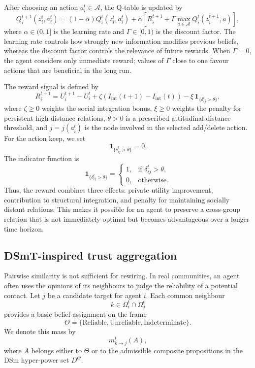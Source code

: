 \documentclass[11pt,a4paper]{article}
\begin{document}
After choosing an action $a_i^t\in\mathcal A$, the Q-table is updated by
\[
Q_i^{t+1}(z_i^t,a_i^t)
=
(1-\alpha)Q_i^t(z_i^t,a_i^t)
+
\alpha
\left[
R_i^{t+1}
+
\Gamma
\max_{a\in\mathcal A}Q_i^t(z_i^{t+1},a)
\right],
\tag{A8}
\]
where $\alpha\in(0,1]$ is the learning rate and $\Gamma\in[0,1)$ is the discount
factor. The learning rate controls how strongly new information modifies previous
beliefs, whereas the discount factor controls the relevance of future rewards.
When $\Gamma=0$, the agent considers only immediate reward; values of $\Gamma$
close to one favour actions that are beneficial in the long run.

The reward signal is defined by
\[
R_i^{t+1}
=
U_i^{t+1}-U_i^t
+
\zeta\left(I_{\mathrm{int}}(t+1)-I_{\mathrm{int}}(t)\right)
-
\xi\,\mathbf 1_{\{\delta_{ij}^t>\theta\}},
\tag{A9}
\]
where $\zeta\geq 0$ weights the social integration bonus, $\xi\geq 0$ weights the
penalty for persistent high-distance relations,  $\theta>0$ is a prescribed
attitudinal-distance threshold, and
$j=j(a_i^t)$ is the node involved in the selected add/delete action. For the
action $\mathrm{keep}$, we set
\[
\mathbf 1_{\{\delta_{ij}^t>\theta\}}=0.
\]
The indicator function is
\[
\mathbf 1_{\{\delta_{ij}^t>\theta\}}
=
\begin{cases}
	1, & \text{if }\delta_{ij}^t>\theta,\\
	0, & \text{otherwise.}
\end{cases}
\]
Thus, the reward combines three effects: private utility improvement, contribution
to structural integration, and penalty for maintaining socially distant relations.
This makes it possible for an agent to preserve a cross-group relation that is not
immediately optimal but becomes advantageous over a longer time horizon.

\subsection{DSmT-inspired trust aggregation}

Pairwise similarity is not sufficient for rewiring. In real communities, an agent
often uses the opinions of its neighbours to judge the reliability of a potential
contact. Let $j$ be a candidate target for agent $i$. Each common neighbour
\[
k\in\Omega_i^t\cap\Omega_j^t
\]
provides a basic belief assignment on the frame
\[
\Theta=\{\mathrm{Reliable},\mathrm{Unreliable},\mathrm{Indeterminate}\}.
\]
We denote this mass by
\[
m_{k\to j}^t(A),
\]
where $A$ belongs either to $\Theta$ or to the admissible composite propositions in
the DSm hyper-power set $D^\Theta$.
\end{document}
